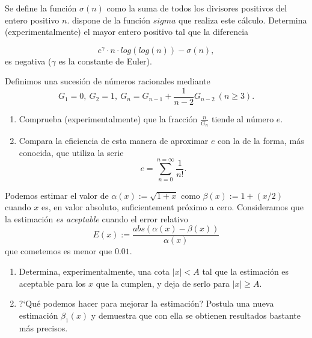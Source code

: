 \begin{ejer}
	
	Se define la funci\'on $\sigma(n)$ como la suma de todos los divisores positivos del entero positivo $n$. {\sage} dispone de la funci\'on $sigma$ que realiza este c\'alculo. Determina (experimentalmente) el mayor entero positivo tal que la diferencia
	
	\[e^\gamma\cdot n \cdot log(log(n))-\sigma(n),\]
	\noindent es negativa ($\gamma$ es la constante de Euler).
	\end{ejer}


\begin{ejer}

	Definimos una sucesi\'on de n\'umeros racionales mediante
	\[G_1=0,\ G_2=1,\ G_n=G_{n-1}+\frac{1}{n-2}G_{n-2} \ (n\ge 3).\]
	\begin{enumerate}
	\item  Comprueba (experimentalmente) que la fracci\'on $\frac{n}{G_n}$ tiende al n\'umero $e$.
	\item  Compara la eficiencia de esta manera de aproximar $e$ con la de la forma, m\'as conocida,  que utiliza la serie 
	\[e=\sum_{n=0}^{n=\infty}\frac{1}{n!}.\]
	\end{enumerate}
	\end{ejer}


 \begin{ejer}
 	
 	Podemos estimar el valor de $\alpha(x):=\sqrt{1+x}$ como $\beta(x):=1+(x/2)$ cuando $x$ es,  en valor absoluto,  suficientement próximo a cero. Consideramos que la estimación {\itshape es aceptable} cuando  el error relativo $$E(x):=\frac{abs(\alpha(x)-\beta(x))}{\alpha(x)}$$ que cometemos es menor que $0.01$. 
 	\begin{enumerate}
 	\item Determina, experimentalmente,  una cota $\vert x\vert < A$ tal que la estimación es aceptable para los $x$ que la cumplen, y deja de serlo para $\vert x\vert \ge A$. 
 	
 	\item ?`Qué podemos hacer para mejorar la estimación? Postula una nueva estimación $\beta_1(x)$ y demuestra que con ella se obtienen resultados bastante más precisos.
 	\end{enumerate}
 	\end{ejer}
 	
